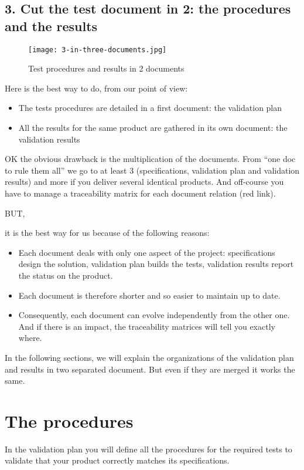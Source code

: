 \subsection{3. Cut the test document in 2: the procedures and the results}

\begin{figure}[h]
    \centering
    \texttt{[image: 3-in-three-documents.jpg]}
    \caption{Test procedures and results in 2 documents}
    \label{fig:ThreeDocument}
\end{figure}

Here is the best way to do, from our point of view:

\begin{itemize}
    \item The tests procedures are detailed in a first document: the validation plan
    \item All the results for the same product are gathered in its own document: the validation results
\end{itemize}

OK the obvious drawback is the multiplication of the documents. From “one doc to rule them all” we go to at least 3 (specifications, validation plan and validation results) and more if you deliver several identical products. And off-course you have to manage a traceability matrix for each document relation (red link).

BUT,

it is the best way for us because of the following reasons:

\begin{itemize}
    \item Each document deals with only one aspect of the project: specifications design the solution, validation plan builds the tests, validation results report the status on the product.
    \item Each document is therefore shorter and so easier to maintain up to date.
    \item Consequently, each document can evolve independently from the other one. And if there is an impact, the traceability matrices will tell you exactly where.
\end{itemize}

In the following sections, we will explain the organizations of the validation plan and results in two separated document. But even if they are merged it works the same.

\section{The procedures}
In the validation plan you will define all the procedures for the required tests to validate that your product correctly matches its specifications.

